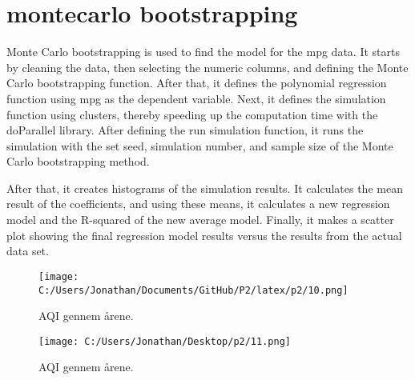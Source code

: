 

\section{montecarlo bootstrapping }

Monte Carlo bootstrapping is used to find the model for the mpg data. It starts by cleaning the data, then selecting the numeric columns, and defining the Monte Carlo bootstrapping function. After that, it defines the polynomial regression function using mpg as the dependent variable. Next, it defines the simulation function using clusters, thereby speeding up the computation time with the doParallel library. After defining the run simulation function, it runs the simulation with the set seed, simulation number, and sample size of the Monte Carlo bootstrapping method.

After that, it creates histograms of the simulation results. It calculates the mean result of the coefficients, and using these means, it calculates a new regression model and the R-squared of the new average model. Finally, it makes a scatter plot showing the final regression model results versus the results from the actual data set.


\begin{figure}[h] 
	\centering
	\texttt{[image: C:/Users/Jonathan/Documents/GitHub/P2/latex/p2/10.png]}
	\caption{AQI gennem årene.}
	\label{fig:j06}
\end{figure}

\begin{figure}[h] 
	\centering
	\texttt{[image: C:/Users/Jonathan/Desktop/p2/11.png]}
	\caption{AQI gennem årene.}
	\label{fig:j06}
\end{figure}